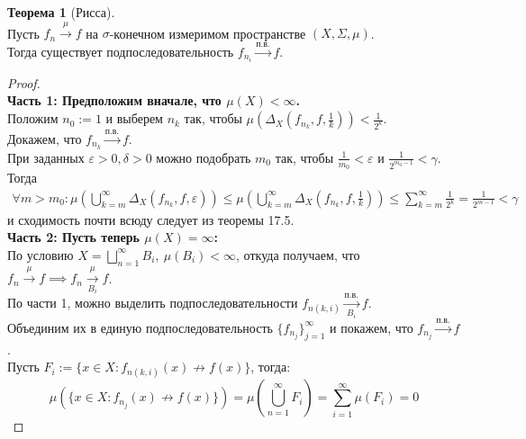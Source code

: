 \documentclass[11pt,a4paper]{report}
\def\eps{\varepsilon}
\theoremstyle{definition}
\theoremstyle{definition}
\newtheorem{theorem}{Теорема}[section]
\theoremstyle{definition}
\begin{document}
		\begin{theorem}[Рисса]$  $\\
			Пусть $ f_{n} \xrightarrow{\mu} f $ на $ \sigma $-конечном измеримом пространстве $ (X, \Sigma, \mu) $.\\ 
			Тогда существует подпоследовательность $ f_{n_{i}} \xrightarrow{п.в.} f $.
		\end{theorem}
		\begin{proof}$  $\\
			\textbf{Часть 1: Предположим вначале, что $ \mu(X) < \infty $.}\\
			Положим $ n_{0} := 1 $ и выберем $ n_{k} $ так, чтобы $ \mu\left (\Delta_{X}\left (f_{n_{k}}, f, \frac{1}{k}\right )\right ) < \frac{1}{2^{k}} $.\\
			Докажем, что $ f_{n_{k}} \xrightarrow{\text{п.в.}} f $.\\
			При заданных $ \eps > 0, \delta > 0 $ можно подобрать $ m_{0} $ так, чтобы $ \frac{1}{m_{0}} < \eps $ и $ \frac{1}{2^{m_{0} - 1}} < \gamma $.\\
			Тогда
			\begin{gather*}
				\forall m > m_{0}: \mu\left (\bigcup\limits_{k=m}^{\infty} \Delta_{X}(f_{n_{k}}, f, \eps)\right ) \le \mu\left (\bigcup\limits_{k=m}^{\infty} \Delta_{X}\left (f_{n_{k}}, f, \frac{1}{k}\right )\right ) \le \sum_{k=m}^{\infty}\frac{1}{2^{k}} = \frac{1}{2^{m-1}} < \gamma
			\end{gather*}
			и сходимость почти всюду следует из теоремы 17.5.\\
			\textbf{Часть 2: Пусть теперь $ \mu(X) = \infty $:}\\
			По условию $ X = \bigsqcup\limits_{n=1}^{\infty}B_{i},\ \mu(B_{i}) < \infty $, откуда получаем, что $ f_{n} \xrightarrow{\mu} f \implies f_{n} \xrightarrow[B_{i}]{\mu} f $.\\
			По части 1, можно выделить подпоследовательности $ f_{n(k, i)} \xrightarrow[B_{i}]{\text{п.в.}} f $.\\
			Объединим их в единую подпоследовательность $ \{f_{n_{j}}\}_{j=1}^{\infty} $ и покажем, что $ f_{n_{j}} \xrightarrow{п.в.} f $.\\
			Пусть $ F_{i} := \{x \in X: f_{n(k, i)}(x) \not \rightarrow f(x) \}$, тогда: 
			\[ \mu\left ( \{x \in X: f_{n_{j}}(x) \not \rightarrow f(x) \} \right ) = \mu\left (\bigcup\limits_{n=1}^{\infty} F_{i}\right ) = \sum_{i=1}^{\infty} \mu(F_{i}) = 0 \]
		\end{proof}
\end{document}

